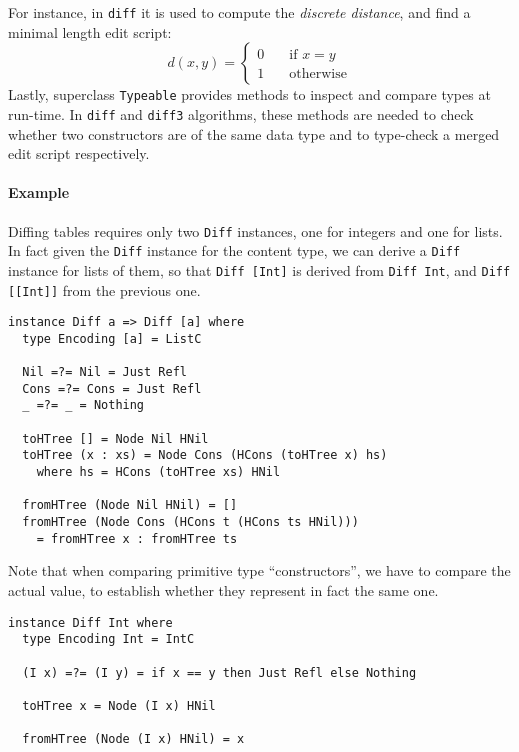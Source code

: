 \documentclass{sigplanconf}
\theoremstyle{plain}
\begin{document}
For instance, in \texttt{diff} it is used to compute the
\emph{discrete distance}, and find a minimal length edit script:
	\[ d(x, y) = 
		\begin{cases} 
			0 \quad &\mbox{if } x = y \\
			1 \quad &\mbox {otherwise}		
		\end{cases} \]	
%
Lastly, superclass \texttt{Typeable} provides methods to inspect
and compare types at run-time.
%
In \texttt{diff} and \texttt{diff3} algorithms, these methods are
needed to check whether two constructors are of the same data type and
to type-check a merged edit script respectively.

\paragraph{Example}
Diffing tables requires only two \texttt{Diff} instances, one for
integers and one for lists.
%
In fact given the \texttt{Diff} instance for the content type, we can
derive a \texttt{Diff} instance for lists of them, so that
\texttt{Diff [Int]} is derived from \texttt{Diff Int}, and
\texttt{Diff [[Int]]} from the previous one.

\begin{verbatim}
instance Diff a => Diff [a] where	
  type Encoding [a] = ListC

  Nil =?= Nil = Just Refl
  Cons =?= Cons = Just Refl
  _ =?= _ = Nothing

  toHTree [] = Node Nil HNil
  toHTree (x : xs) = Node Cons (HCons (toHTree x) hs)
    where hs = HCons (toHTree xs) HNil

  fromHTree (Node Nil HNil) = []
  fromHTree (Node Cons (HCons t (HCons ts HNil))) 
    = fromHTree x : fromHTree ts
\end{verbatim} 
%
Note that when comparing primitive type ``constructors'', we have to
compare the actual value, to establish whether they represent in fact
the same one.
\begin{verbatim}
instance Diff Int where
  type Encoding Int = IntC

  (I x) =?= (I y) = if x == y then Just Refl else Nothing
  
  toHTree x = Node (I x) HNil
  
  fromHTree (Node (I x) HNil) = x
\end{verbatim}
%
%
\end{document}

